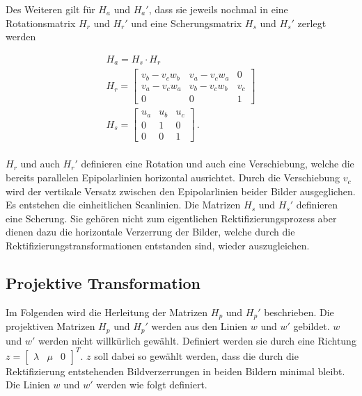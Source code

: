 Des Weiteren gilt für $H_a$ und $H_a'$, dass sie jeweils nochmal in eine Rotationsmatrix $H_r$ und $H_r'$ und eine Scherungsmatrix $H_s$ und $H_s'$ zerlegt werden\cite{ZZ,phdextrinsicPara}


\begin{gather}
	H_a = H_s \cdot H_r\\
	H_r = 
	\begin{bmatrix}
		v_b-v_cw_b&	v_a-v_cw_a&0\\
		v_a-v_cw_a&v_b-v_cw_b&v_c\\
		0&0&1
	\end{bmatrix} \label{eq:DefHr}\\
	H_s = 
	\begin{bmatrix}
		u_a&u_b&u_c\\
		0&1&0\\
		0&0&1
	\end{bmatrix}\label{eq:DefHs} \, .
\end{gather}\\

$H_r$ und auch $H_r'$ definieren eine Rotation und auch eine Verschiebung, welche die bereits parallelen Epipolarlinien horizontal ausrichtet. Durch die Verschiebung $v_c$ wird der vertikale Versatz zwischen den Epipolarlinien beider Bilder ausgeglichen. Es entstehen die einheitlichen Scanlinien. Die Matrizen $H_s$ und $H_s'$ definieren eine Scherung. 
Sie gehören nicht zum eigentlichen Rektifizierungsprozess aber dienen dazu die horizontale Verzerrung der Bilder, welche durch die Rektifizierungstransformationen entstanden sind, wieder auszugleichen. 

%

\subsection{Projektive Transformation}

Im Folgenden wird die Herleitung der Matrizen $H_p$ und $H_p'$ beschrieben. Die projektiven Matrizen $H_p$ und $H_p'$ werden aus den Linien $w$ und $w'$ gebildet. $w$ und $w'$ werden nicht willkürlich gewählt. Definiert werden sie durch eine Richtung $z = \begin{bmatrix}
\lambda&\mu&0\end{bmatrix}^T$. $z$ soll dabei so gewählt werden, dass die durch die Rektifizierung entstehenden Bildverzerrungen in beiden Bildern minimal bleibt. Die Linien $w$ und $w'$ werden wie folgt definiert.

